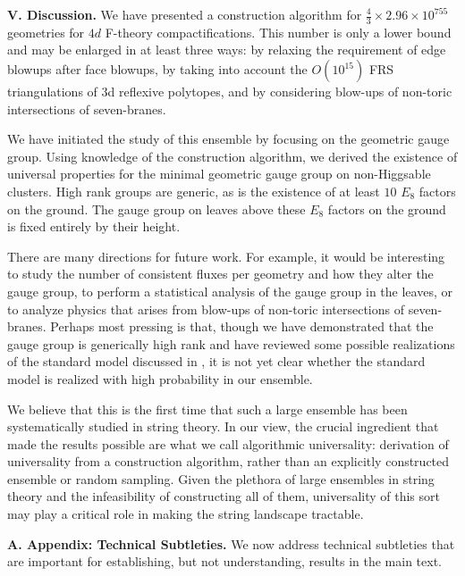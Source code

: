 \documentclass[aps,prl,twocolumn, superscriptaddress,groupedaddress,nofootinbib]{revtex4-1}
\begin{document}
\vspace{.2cm}
\noindent \textbf{V. Discussion.} 
We have presented a construction algorithm for  $\frac43 \times  2.96\times
10^{755}$ geometries for $4d$ F-theory compactifications. This number is only
a lower bound and may be enlarged in at least three ways: by relaxing
the requirement of edge blowups after  face blowups, by taking into account
the $O(10^{15})$ FRS triangulations of 3d reflexive polytopes, and by
considering blow-ups of non-toric intersections of seven-branes.

We have initiated the study of this ensemble by focusing on the geometric gauge group.
Using knowledge of the construction algorithm, we derived the existence of universal
properties for the minimal geometric gauge group on non-Higgsable clusters. High
rank groups are generic, as is the existence of at least $10$ $E_8$ factors on the ground.
The gauge group on leaves above these $E_8$ factors on the ground is fixed entirely by their height.

There are many directions for future work. For example, it would be
interesting to study the number of consistent fluxes per geometry and how they alter the gauge group, to
perform a statistical analysis of the gauge group in the leaves, or to analyze
physics that arises from blow-ups of non-toric intersections of seven-branes. 
Perhaps most pressing is that, though we have demonstrated that the gauge group is generically 
high rank and have reviewed some possible realizations of the standard model discussed in \cite{Grassi:2014zxa}, it is not yet clear whether the standard model is realized with high probability in our ensemble.


We believe that this is the first time that such a large ensemble has been systematically
studied in string theory. In our view, the crucial ingredient that made the results
possible are what we call algorithmic
universality: derivation of universality from a construction algorithm, rather than
an explicitly constructed ensemble or random sampling. Given the plethora of large ensembles in string theory
and the infeasibility of constructing all of them, universality of this sort may play
a critical role in making the string landscape tractable.



\vspace{.2cm}
\noindent \textbf{A. Appendix: Technical Subtleties.} We now
address technical subtleties that are important for establishing,
but not understanding, results in the main text.
\end{document}
